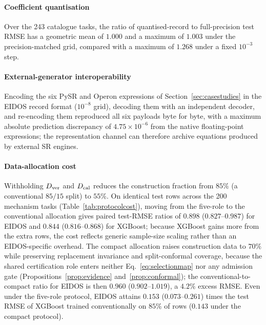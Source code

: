 \paragraph{Coefficient quantisation} Over the 243 catalogue tasks, the ratio of quantised-record to full-precision test RMSE has a geometric mean of \(1.000\) and a maximum of \(1.003\) under the precision-matched grid, compared with a maximum of \(1.268\) under a fixed \(10^{-3}\) step.

\paragraph{External-generator interoperability} Encoding the six PySR and Operon expressions of Section~\ref{sec:casestudies} in the EIDOS record format (\(10^{-8}\) grid), decoding them with an independent decoder, and re-encoding them reproduced all six payloads byte for byte, with a maximum absolute prediction discrepancy of \(4.75\times10^{-6}\) from the native floating-point expressions; the representation channel can therefore archive equations produced by external SR engines.

\paragraph{Data-allocation cost} Withholding \(D_{\rm ver}\) and \(D_{\rm cal}\) reduces the construction fraction from \(85\%\) (a conventional \(85/15\) split) to \(55\%\). On identical test rows across the 200 mechanism tasks (Table~\ref{tab:protocolcost}), moving from the five-role to the conventional allocation gives paired test-RMSE ratios of \(0.898\) (\(0.827\)--\(0.987\)) for EIDOS and \(0.844\) (\(0.816\)--\(0.868\)) for XGBoost; because XGBoost gains more from the extra rows, the cost reflects generic sample-size scaling rather than an EIDOS-specific overhead. The compact allocation raises construction data to \(70\%\) while preserving replacement invariance and split-conformal coverage, because the shared certification role enters neither Eq.~\eqref{eq:selectionmap} nor any admission gate (Propositions~\ref{prop:evidence} and~\ref{prop:conformal}); the conventional-to-compact ratio for EIDOS is then \(0.960\) (\(0.902\)--\(1.019\)), a \(4.2\%\) excess RMSE. Even under the five-role protocol, EIDOS attains \(0.153\) (\(0.073\)--\(0.261\)) times the test RMSE of XGBoost trained conventionally on \(85\%\) of rows (\(0.143\) under the compact protocol).

